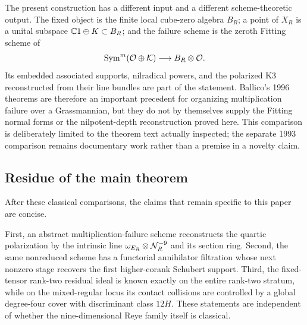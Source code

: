 The present construction has a different input and a different
scheme-theoretic output.  The fixed object is the finite local
cube-zero algebra $B_R$; a point of $X_R$ is a unital subspace
$\mathbb C1\oplus K\subset B_R$; and the failure scheme is the zeroth Fitting
scheme of
\[
 \operatorname{Sym}^m(\mathcal O\oplus\mathcal K)\longrightarrow B_R\otimes\mathcal O.
\]
Its embedded associated supports, nilradical powers, and the
polarized K3 reconstructed from their line bundles are part of the
statement.  Ballico's 1996 theorems are therefore an important
precedent for organizing multiplication failure over a Grassmannian,
but they do not by themselves supply the Fitting normal forms or the
nilpotent-depth reconstruction proved here.  This comparison is
deliberately limited to the theorem text actually inspected; the
separate 1993 comparison remains documentary work rather than a
premise in a novelty claim.

\subsection{Residue of the main theorem}

After these classical comparisons, the claims that remain specific to
this paper are concise.

First, an abstract multiplication-failure scheme reconstructs the
quartic polarization by the intrinsic line
$\omega_{E_R}\otimes\mathcal N_R^{-9}$ and its section ring.  Second, the
same nonreduced scheme has a functorial annihilator filtration whose
next nonzero stage recovers the first higher-corank Schubert support.
Third, the fixed-tensor rank-two residual ideal is known exactly on
the entire rank-two stratum, while on the mixed-regular locus its
contact collisions are controlled by a global degree-four cover with
discriminant class $12H$.  These statements are independent of
whether the nine-dimensional Reye family itself is classical.
